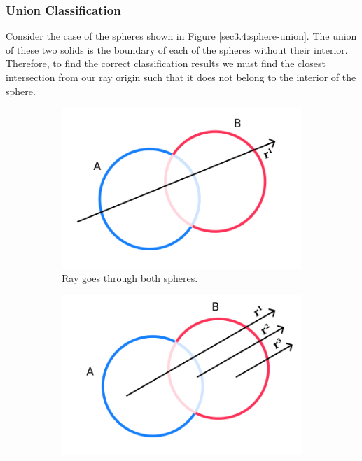 \documentclass[a4paper,11pt,oneside]{article}
\begin{document}
\subsubsection{Union Classification}

Consider the case of the spheres shown in Figure \ref{sec3.4:sphere-union}. The union of these two solids is the boundary of each of the spheres without their interior. Therefore, to find the correct classification results we must find the closest intersection from our ray origin such that it does not belong to the interior of the sphere.

\begin{figure}[ht]
	\centering
	\begin{subfigure}[b]{0.3\textwidth}
		\centering
		\includegraphics[width=\textwidth]{section4/4.1/union-case-1.png}
		\caption{Ray goes through both spheres.}
		\label{sec3.4:union-case1}
	\end{subfigure}
	\hfill
	\begin{subfigure}[b]{0.3\textwidth}
		\centering
		\includegraphics[width=\textwidth]{section4/4.1/union-case-2.png}

\end{subfigure}
\end{figure}
\end{document}
